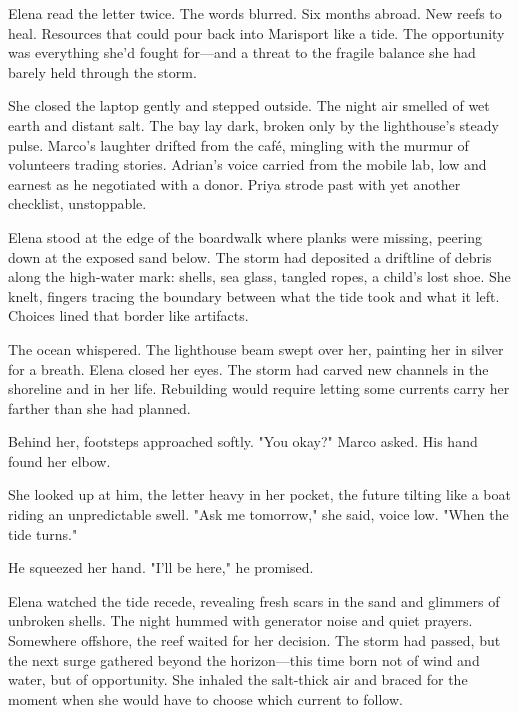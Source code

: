 Elena read the letter twice. The words blurred. Six months abroad. New reefs to heal. Resources that could pour back into Marisport like a tide. The opportunity was everything she'd fought for—and a threat to the fragile balance she had barely held through the storm.

She closed the laptop gently and stepped outside. The night air smelled of wet earth and distant salt. The bay lay dark, broken only by the lighthouse's steady pulse. Marco's laughter drifted from the café, mingling with the murmur of volunteers trading stories. Adrian's voice carried from the mobile lab, low and earnest as he negotiated with a donor. Priya strode past with yet another checklist, unstoppable.

Elena stood at the edge of the boardwalk where planks were missing, peering down at the exposed sand below. The storm had deposited a driftline of debris along the high-water mark: shells, sea glass, tangled ropes, a child's lost shoe. She knelt, fingers tracing the boundary between what the tide took and what it left. Choices lined that border like artifacts.

The ocean whispered. The lighthouse beam swept over her, painting her in silver for a breath. Elena closed her eyes. The storm had carved new channels in the shoreline and in her life. Rebuilding would require letting some currents carry her farther than she had planned.

Behind her, footsteps approached softly. "You okay?" Marco asked. His hand found her elbow.

She looked up at him, the letter heavy in her pocket, the future tilting like a boat riding an unpredictable swell. "Ask me tomorrow," she said, voice low. "When the tide turns."

He squeezed her hand. "I'll be here," he promised.

Elena watched the tide recede, revealing fresh scars in the sand and glimmers of unbroken shells. The night hummed with generator noise and quiet prayers. Somewhere offshore, the reef waited for her decision. The storm had passed, but the next surge gathered beyond the horizon—this time born not of wind and water, but of opportunity. She inhaled the salt-thick air and braced for the moment when she would have to choose which current to follow.
